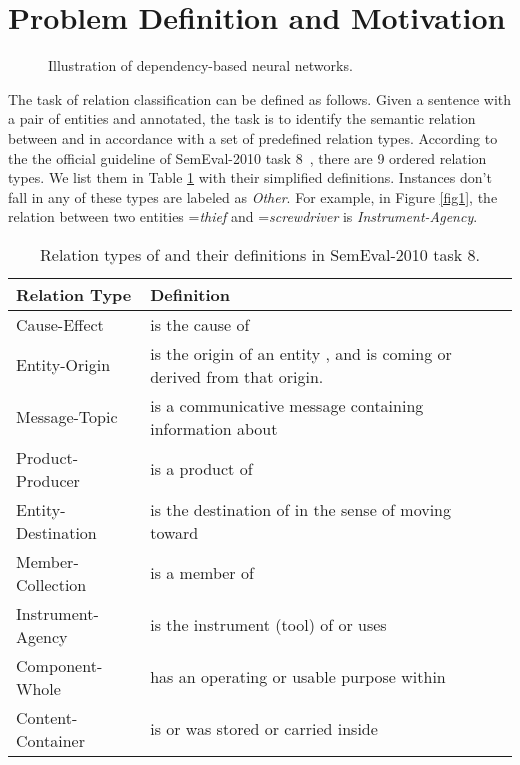 \documentclass[11pt]{article}
\begin{document}
\section{Problem Definition and Motivation}


\begin{figure*}[htbp]

\centering{}
\caption{ Illustration of dependency-based neural networks. }\label{fig:4}
\end{figure*}



The task of relation classification can be defined as follows. Given a sentence  with a pair of entities  and  annotated, the task is to identify the semantic relation between  and  in accordance with a set of predefined relation types. According to the the official guideline of SemEval-2010 task 8~\cite{5009814}, there are 9 ordered relation types.  We list them in Table \ref{tab:types} with their simplified definitions. Instances don't fall in any of these types are labeled as \textit{Other}. For example, in Figure \ref{fig1}, the relation between two entities =\emph{thief} and =\emph{screwdriver} is \textit{Instrument-Agency}.

\begin{table}
\renewcommand\arraystretch{1.1}
\small
\begin{tabular}{|l|p{15em}|}
\hline
Relation Type & Definition\\
\hline
Cause-Effect& is the cause of \\
\hline
Entity-Origin& is the origin of an entity  , and  is coming
or derived from that origin. \\
\hline
Message-Topic& is a communicative message containing information about \\
\hline
Product-Producer& is a product of \\
\hline
Entity-Destination& is the destination of  in the sense of  moving toward \\
\hline
Member-Collection& is a member of \\
\hline
Instrument-Agency& is the instrument (tool) of  or  uses \\
\hline
Component-Whole& has an operating or usable purpose within \\
\hline
Content-Container& is or was stored or carried inside  \\
\hline
\end{tabular}
\caption{\label{tab:types}Relation types of  and their definitions in SemEval-2010 task 8.}
\end{table}
\end{document}
